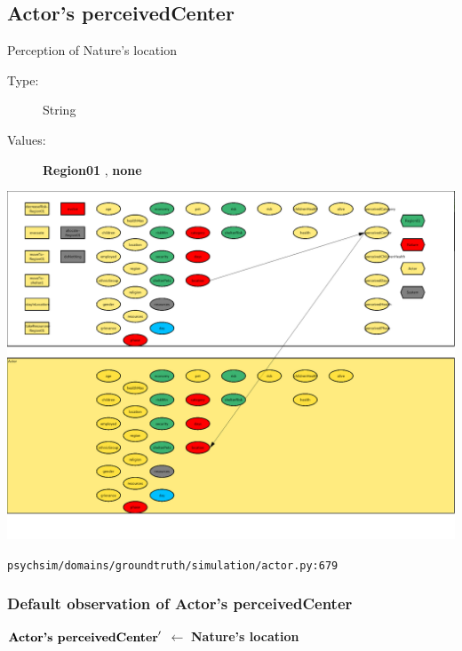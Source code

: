 \documentclass{article}%
\begin{document}
\subsection{Actor's perceivedCenter}%
\label{subsec:Actor's perceivedCenter}%
Perception of Nature's location%
\begin{description}%
\item[Type:]%
String%
\item[Values:]%
\textbf{Region01}%
, %
\textbf{none}%
\end{description}%
\includegraphics[width=\textwidth]{images/perceivedCenterOfActor.png}%
\begin{flushleft}%
\verb|psychsim/domains/groundtruth/simulation/actor.py:679|%
\end{flushleft}%
\subsubsection{Default observation of Actor's perceivedCenter}%
\label{ssubsec:Default observation of Actor's perceivedCenter}%
\begin{flushleft}%
$\mbox{\textbf{Actor's perceivedCenter}} '$%
$\leftarrow$%
\textbf{Nature's location}%
\end{flushleft}

%
\end{document}
